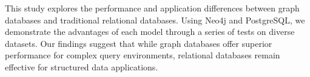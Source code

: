 This study explores the performance and application differences between graph databases and traditional relational databases. Using Neo4j and PostgreSQL, we demonstrate the advantages of each model through a series of tests on diverse datasets. Our findings suggest that while graph databases offer superior performance for complex query environments, relational databases remain effective for structured data applications.
